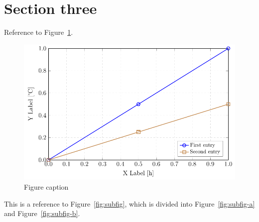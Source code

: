 \section{Section three}\label{sec:section3}

Reference to Figure~\ref{fig:plot}.

\begin{figure}[hbt!]
  \centering
  \includegraphics[width=0.8\linewidth]{figures/plot1.pdf}
  \caption{Figure caption}\label{fig:plot}
\end{figure}

This is a reference to Figure~\ref{fig:subfig}, which is divided into
Figure~\ref{fig:subfig-a} and Figure~\ref{fig:subfig-b}.


